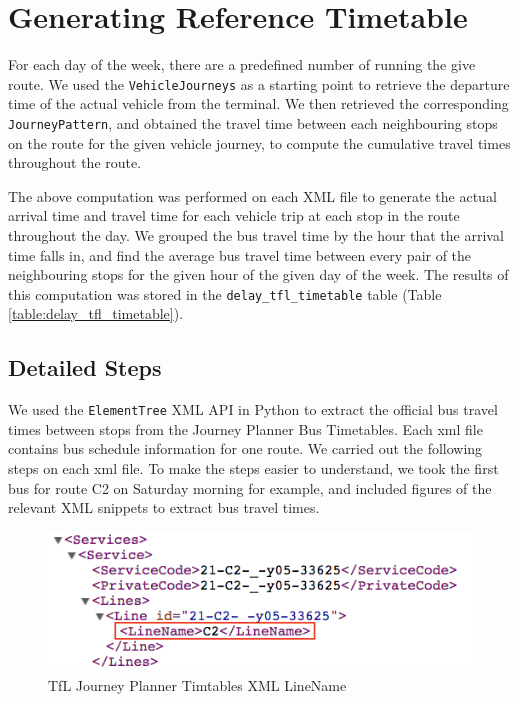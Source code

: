 \section{Generating Reference Timetable}
\label{sec: official_tfl_timetable}
For each day of the week, there are a predefined number of running the give route. We used the \texttt{VehicleJourneys} as a starting point to retrieve the departure time of the actual vehicle from the terminal. We then retrieved the corresponding \texttt{JourneyPattern}, and obtained the travel time between each neighbouring stops on the route for the given vehicle journey, to compute the cumulative travel times throughout the route.

The above computation was performed on each XML file to generate the actual arrival time and travel time for each vehicle trip at each stop in the route throughout the day. We grouped the bus travel time by the hour that the arrival time falls in, and find the average bus travel time between every pair of the neighbouring stops for the given hour of the given day of the week. The results of this computation was stored in the \texttt{delay\_tfl\_timetable} table (Table \ref{table:delay_tfl_timetable}).

\subsection{Detailed Steps}

\par We used the \texttt{ElementTree} XML API in Python \cite{elementtree} to extract the official bus travel times between stops from the Journey Planner Bus Timetables\cite{open_data_feeds_description}. Each \acrshort{xml} file contains bus schedule information for one route. We carried out the following steps on each \acrshort{xml} file. To make the steps easier to understand, we took the first bus for route C2 on Saturday morning for example, and included figures of the relevant XML snippets to extract bus travel times.

\begin{figure}
\centering
\includegraphics[width=\textwidth]{figures/xml_linename.png}
\caption{\label{fig:xml_linename} TfL Journey Planner Timtables XML LineName}
\end{figure}

